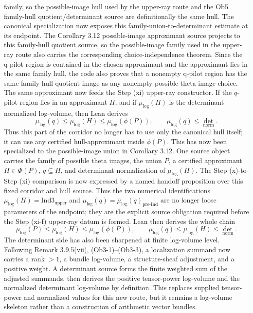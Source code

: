 \documentclass[11pt]{article}
\newcommand{\Lean}{Lean}
\newcommand{\Ind}{\ensuremath{\mathrm{Ind}}}
\theoremstyle{plain}
\theoremstyle{definition}
\theoremstyle{remark}
\begin{document}
family, so the possible-image hull used by the upper-ray route and the Ob5
family-hull quotient/determinant source are definitionally the same hull.
The canonical specialization now exposes this family-union-to-determinant
estimate at its endpoint.
The Corollary 3.12 possible-image approximant source projects to this
family-hull quotient source, so the possible-image family used in the
upper-ray route also carries the corresponding choice-independence theorem.
Since the q-pilot region is contained in the chosen approximant and the
approximant lies in the same family hull, the code also proves that a nonempty
q-pilot region has the same family-hull quotient image as any nonempty
possible theta-image choice.
The same approximant now feeds the Step (xi) upper-ray constructor.  If the
\(q\)-pilot region lies in an approximant \(H\), and if
\(\mu_{\log}(H)\) is the determinant-normalized log-volume, then \Lean{}
derives
\[
  \mu_{\log}(q)\le \mu_{\log}(H)\le \mu_{\log}(\phi(P)),
  \qquad
  \mu_{\log}(q)\le \det_{\mathrm{norm}} .
\]
Thus this part of the corridor no longer has to use only the canonical hull
itself; it can use any certified hull-approximant inside \(\phi(P)\).
This has now been specialized to the possible-image union in Corollary 3.12.
One source object carries the family of possible theta images, the union \(P\),
a certified approximant \(H\in\Phi(P)\), \(q\subseteq H\), and determinant
normalization of \(\mu_{\log}(H)\).  The Step (x)-to-Step (xi) comparison is
now expressed by a named handoff proposition over this fixed corridor and hull
source.  Thus the two numerical identifications
\(\mu_{\log}(H)=\Ind3_{\mathrm{upper}}\) and
\(\mu_{\log}(q)=\overline{\mu}_{\log}(q)_{\mathrm{pre}\text{-}\Ind}\)
are no longer loose parameters of the endpoint; they are the explicit source
obligation required before the Step (xi-f) upper-ray datum is formed.
\Lean{} then derives the whole chain
\[
  \mu_{\log}(P)\le\mu_{\log}(H)\le\mu_{\log}(\phi(P)),
  \qquad
  \mu_{\log}(q)\le\mu_{\log}(H)\le\det_{\mathrm{norm}}.
\]
The determinant side has also been sharpened at finite log-volume level.
Following Remark 3.9.5(vii), (Ob3-1)--(Ob3-3), a localization summand now
carries a rank \(>1\), a bundle log-volume, a structure-sheaf adjustment, and
a positive weight.  A determinant source forms the finite weighted sum of the
adjusted summands, then derives the positive tensor-power log-volume and the
normalized determinant log-volume by definition.  This replaces supplied
tensor-power and normalized values for this new route, but it remains a
log-volume skeleton rather than a construction of arithmetic vector bundles.
\end{document}

